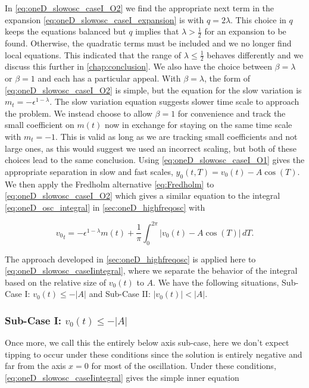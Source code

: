 In \eqref{eq:oneD_slowosc_caseI_O2} we find the appropriate next term in the expansion \eqref{eq:oneD_slowosc_caseI_expansion} is with $q=2\lambda$. This choice in $q$ keeps the equations balanced but $q$ implies that $\lambda> \frac{1}{2}$ for an expansion to be found. Otherwise, the quadratic terms must be included and we no longer find local equations. This indicated that the range of $\lambda\le\frac{1}{2}$ behaves differently and we discuss this further in \autoref{chap:conclusion}. We also have the choice between $\beta=\lambda$ or $\beta=1$ and each has a particular appeal. With $\beta=\lambda$, the form of \eqref{eq:oneD_slowosc_caseI_O2} is simple, but the equation for the slow variation is $m_t=-\epsilon^{1-\lambda}$. The slow variation equation suggests slower time scale to approach the problem. We instead choose to allow $\beta=1$ for convenience and track the small coefficient on $m(t)$ now in exchange for staying on the same time scale with $m_t=-1$. This is valid as long as we are tracking small coefficients and not large ones, as this would suggest we used an incorrect scaling, but both of these choices lead to the same conclusion. Using \eqref{eq:oneD_slowosc_caseI_O1} gives the appropriate separation in slow and fast scales, $y_0(t,T)=v_0(t)-A\cos(T)$. We then apply the Fredholm alternative \eqref{eq:Fredholm} to \eqref{eq:oneD_slowosc_caseI_O2} which gives a similar equation to the integral \eqref{eq:oneD_osc_integral} in \autoref{sec:oneD_highfreqosc} with

\begin{equation}\label{eq:oneD_slowosc_caseIintegral}
{v_0}_t = -\epsilon^{1-\lambda}m(t)+\frac{1}{\pi}\int_0^{2\pi} |v_0(t)-A\cos(T)|\,dT.
\end{equation}

The approach developed in \autoref{sec:oneD_highfreqosc} is applied here to \eqref{eq:oneD_slowosc_caseIintegral}, where we separate the behavior of the integral based on the relative size of $v_0(t)$ to $A$. We have the following situations, Sub-Case I: $v_0(t)\le -|A|$ and Sub-Case II: $|v_0(t)|<|A|$.

\subsubsection{Sub-Case I: $v_0(t) \le -|A|$} 
\label{subsubsec:oneD_slowosc_subcaseI}

Once more, we call this the entirely below axis sub-case, here we don't expect tipping to occur under these conditions since the solution is entirely negative and far from the axis $x=0$ for most of the oscillation. Under these conditions, \eqref{eq:oneD_slowosc_caseIintegral} gives the simple inner equation

